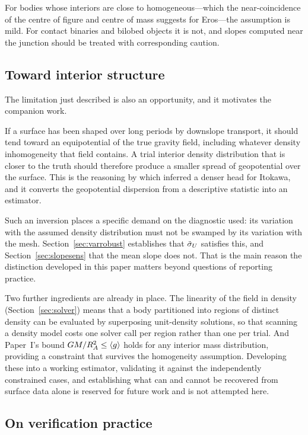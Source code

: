 For bodies whose interiors are close to homogeneous---which the near-coincidence
of the centre of figure and centre of mass suggests for Eros---the assumption is
mild. For contact binaries and bilobed objects it is not, and slopes computed
near the junction should be treated with corresponding caution.

\subsection{Toward interior structure}
\label{sec:interior}

The limitation just described is also an opportunity, and it motivates the
companion work.

If a surface has been shaped over long periods by downslope transport, it should
tend toward an equipotential of the true gravity field, including whatever
density inhomogeneity that field contains. A trial interior density
distribution that is closer to the truth should therefore produce a smaller
spread of geopotential over the surface. This is the reasoning by which
\citet{kanamaru2019} inferred a denser head for Itokawa, and it converts the
geopotential dispersion from a descriptive statistic into an estimator.

Such an inversion places a specific demand on the diagnostic used: its variation
with the assumed density distribution must not be swamped by its variation with
the mesh. Section~\ref{sec:varrobust} establishes that $\tilde{\sigma}_{U}$ satisfies
this, and Section~\ref{sec:slopesens} that the mean slope does not. That is the
main reason the distinction developed in this paper matters beyond questions of
reporting practice.

Two further ingredients are already in place. The linearity of the field in
density (Section~\ref{sec:solver}) means that a body partitioned into regions
of distinct density can be evaluated by superposing unit-density solutions, so
that scanning a density model costs one solver call per region rather than one
per trial. And Paper~I's bound $GM/R_{A}^{2}\le\langle g\rangle$ \citep{paper1} holds for
any interior mass distribution, providing a constraint that survives the
homogeneity assumption. Developing these into a working estimator, validating
it against the independently constrained cases, and establishing what can and
cannot be recovered from surface data alone is reserved for future work and is
not attempted here.

\subsection{On verification practice}
\label{sec:verifpractice}


